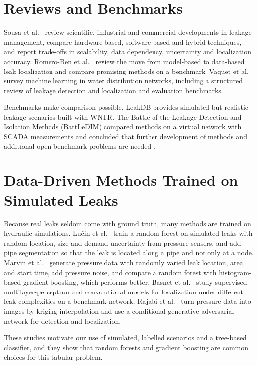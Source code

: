\documentclass[11pt,letterpaper]{report}
\theoremstyle{definition}
\theoremstyle{plain}
\theoremstyle{remark}
\begin{document}
\section{Reviews and Benchmarks}
Sousa et al.\ \cite{sousa2026review} review scientific, industrial and commercial developments in leakage management, compare hardware-based, software-based and hybrid techniques, and report trade-offs in scalability, data dependency, uncertainty and localization accuracy. Romero-Ben et al.\ \cite{romeroben2023review} review the move from model-based to data-based leak localization and compare promising methods on a benchmark. Vaquet et al.\ \cite{vaquet2024survey} survey machine learning in water distribution networks, including a structured review of leakage detection and localization and evaluation benchmarks.

Benchmarks make comparison possible. LeakDB \cite{vrachimis2018leakdb} provides simulated but realistic leakage scenarios built with WNTR. The Battle of the Leakage Detection and Isolation Methods (BattLeDIM) compared methods on a virtual network with SCADA measurements and concluded that further development of methods and additional open benchmark problems are needed \cite{vrachimis2022battledim}.

\section{Data-Driven Methods Trained on Simulated Leaks}
Because real leaks seldom come with ground truth, many methods are trained on hydraulic simulations. Lu\v{c}in et al.\ \cite{lucin2021rf} train a random forest on simulated leaks with random location, size and demand uncertainty from pressure sensors, and add pipe segmentation so that the leak is located along a pipe and not only at a node. Marvin et al.\ \cite{marvin2023hgb} generate pressure data with randomly varied leak location, area and start time, add pressure noise, and compare a random forest with histogram-based gradient boosting, which performs better. Basnet et al.\ \cite{basnet2023supervised} study supervised multilayer-perceptron and convolutional models for localization under different leak complexities on a benchmark network. Rajabi et al.\ \cite{rajabi2023cdcgan} turn pressure data into images by kriging interpolation and use a conditional generative adversarial network for detection and localization.

These studies motivate our use of simulated, labelled scenarios and a tree-based classifier, and they show that random forests and gradient boosting are common choices for this tabular problem.
\end{document}
